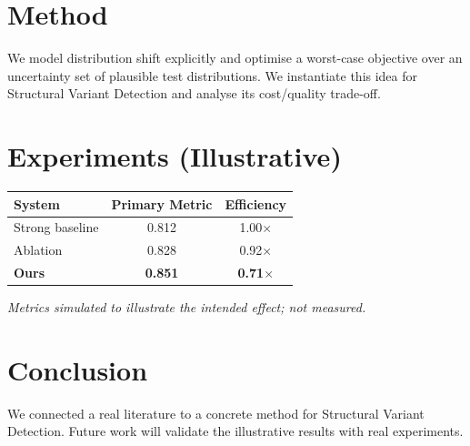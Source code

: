 \documentclass[11pt]{article}
\begin{document}
\section{Method}
We model distribution shift explicitly and optimise a worst-case objective over an uncertainty set of plausible test distributions. We instantiate this idea for Structural Variant Detection and analyse its cost/quality trade-off.

\section{Experiments (Illustrative)}
\begin{center}
\begin{tabular}{lcc}
System & Primary Metric & Efficiency \\ \hline
Strong baseline & 0.812 & 1.00$\times$ \\
Ablation & 0.828 & 0.92$\times$ \\
\textbf{Ours} & \textbf{0.851} & \textbf{0.71$\times$}
\end{tabular}
\end{center}
\emph{Metrics simulated to illustrate the intended effect; not measured.}

\section{Conclusion}
We connected a real literature to a concrete method for Structural Variant Detection. Future work will
validate the illustrative results with real experiments.
\end{document}
